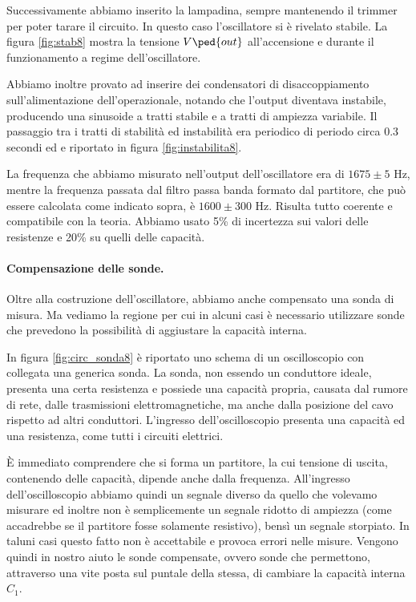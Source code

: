 Successivamente abbiamo inserito la lampadina, sempre mantenendo il trimmer per poter tarare il circuito. In questo caso l'oscillatore
si è rivelato stabile. La figura \ref{fig:stab8} mostra la tensione $V\ped{out}$ all'accensione e durante il funzionamento a regime dell'oscillatore.

Abbiamo inoltre provato ad inserire dei condensatori di disaccoppiamento sull'alimentazione dell'operazionale, notando che
l'output diventava instabile, producendo una sinusoide a tratti stabile e a tratti di ampiezza variabile.
Il passaggio tra i tratti di stabilità ed instabilità era periodico di periodo circa 0.3 secondi ed e riportato in figura \ref{fig:instabilita8}.

La frequenza che abbiamo misurato nell'output dell'oscillatore era di $1675 \pm 5$ Hz, mentre la frequenza passata
dal filtro passa banda formato dal partitore, che può essere calcolata come indicato sopra, è $1600 \pm 300$ Hz. Risulta
tutto coerente e compatibile con la teoria. Abbiamo usato 5\% di incertezza sui valori delle resistenze e 20\% su quelli
delle capacità.

\paragraph{Compensazione delle sonde.}

Oltre alla costruzione dell'oscillatore, abbiamo anche compensato una sonda di misura. Ma vediamo la regione per cui
in alcuni casi è necessario utilizzare sonde che prevedono la possibilità di aggiustare la capacità interna.

In figura \ref{fig:circ_sonda8} è riportato uno schema di un oscilloscopio con collegata una generica sonda.
La sonda, non essendo un conduttore ideale, presenta una certa resistenza e possiede una capacità propria, causata
dal rumore di rete, dalle trasmissioni elettromagnetiche, ma anche dalla posizione del cavo rispetto ad altri conduttori.
L'ingresso dell'oscilloscopio presenta una capacità ed una resistenza, come tutti i circuiti elettrici.

È immediato comprendere che si forma un partitore, la cui tensione di uscita, contenendo delle capacità, dipende anche dalla
frequenza. All'ingresso dell'oscilloscopio abbiamo quindi un segnale diverso da quello che volevamo misurare ed inoltre non
è semplicemente un segnale ridotto di ampiezza (come accadrebbe se il partitore fosse solamente resistivo),
bensì un segnale storpiato. In taluni casi questo fatto non è accettabile e provoca errori nelle misure.
Vengono quindi in nostro aiuto le sonde compensate, ovvero sonde che permettono, attraverso una vite posta sul
puntale della stessa, di cambiare la capacità interna $C_1$.

